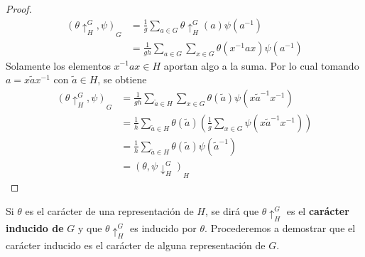 \documentclass[12pt]{book}
\theoremstyle{definition}
\newcounter{in}
\begin{document}
\begin{proof}
  \begin{equation}
    \label{eq:59}
    \begin{aligned}
      (\theta\uparrow^{G}_{H},\psi)_{G} &= \frac{1}{g} \sum_{a \in G} \theta\uparrow^{G}_{H} (a) \psi(a^{-1})\\
      &= \frac{1}{gh} \sum_{a \in G} \sum_{x \in G} \theta(x^{-1}ax) \psi(a^{-1})
    \end{aligned}
  \end{equation}  
  Solamente los elementos $x^{-1}ax \in H$ aportan algo a la suma. Por
  lo cual tomando $a=x \tilde{a} x^{-1}$ con $\tilde{a} \in H$, se
  obtiene
  \begin{equation}
    \label{eq:60}
    \begin{aligned}
      (\theta\uparrow^{G}_{H},\psi)_{G} &= \frac{1}{gh} \sum_{\tilde{a} \in H} \sum_{x \in G} \theta(\tilde{a}) \psi(x \tilde{a}^{-1} x^{-1})\\
      &= \frac{1}{h} \sum_{\tilde{a} \in H} \theta (\tilde{a}) (\frac{1}{g}\sum_{x \in G} \psi(x \tilde{a}^{-1}x^{-1})) \\
      &= \frac{1}{h} \sum_{\tilde{a} \in H} \theta (\tilde{a}) \psi(\tilde{a}^{-1}) \\
      &=  (\theta,\psi\downarrow^{G}_{H})_{H}
    \end{aligned}
  \end{equation}
\end{proof}
Si $\theta$ es el carácter de una representación de $H$, se dirá que
$\theta\uparrow^{G}_{H}$ es el \textbf{carácter inducido de} $G$ y que
$\theta\uparrow^{G}_{H}$ es inducido por $\theta$. Procederemos a
demostrar que el carácter inducido es el carácter de alguna
representación de $G$.
\end{document}
